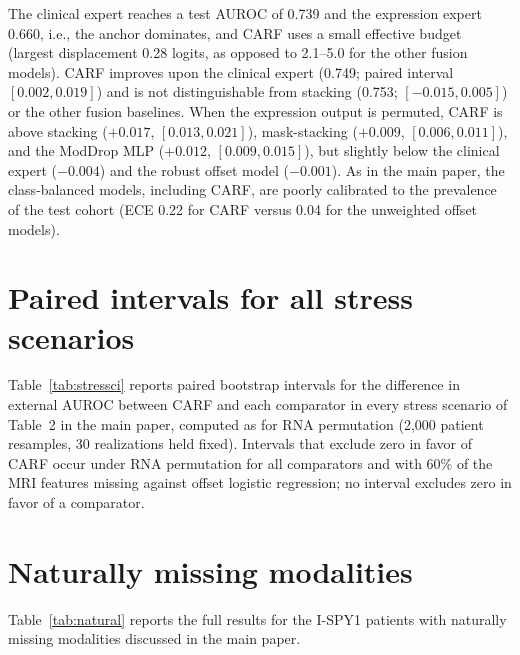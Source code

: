 \documentclass[runningheads]{llncs}
\begin{document}
The clinical expert reaches a test AUROC of 0.739 and the expression expert 0.660, i.e., the anchor dominates, and CARF uses a small effective budget (largest displacement 0.28 logits, as opposed to 2.1--5.0 for the other fusion models). CARF improves upon the clinical expert (0.749; paired interval $[0.002,0.019]$) and is not distinguishable from stacking (0.753; $[-0.015,0.005]$) or the other fusion baselines. When the expression output is permuted, CARF is above stacking ($+0.017$, $[0.013,0.021]$), mask-stacking ($+0.009$, $[0.006,0.011]$), and the ModDrop MLP ($+0.012$, $[0.009,0.015]$), but slightly below the clinical expert ($-0.004$) and the robust offset model ($-0.001$). As in the main paper, the class-balanced models, including CARF, are poorly calibrated to the prevalence of the test cohort (ECE 0.22 for CARF versus 0.04 for the unweighted offset models).

\section{Paired intervals for all stress scenarios}

Table~\ref{tab:stressci} reports paired bootstrap intervals for the difference in external AUROC between CARF and each comparator in every stress scenario of Table~2 in the main paper, computed as for RNA permutation (2{,}000 patient resamples, 30 realizations held fixed). Intervals that exclude zero in favor of CARF occur under RNA permutation for all comparators and with 60\% of the MRI features missing against offset logistic regression; no interval excludes zero in favor of a comparator.

\begin{table}[h]
\centering
\caption{CARF minus comparator external AUROC, median [2.5\%, 97.5\%] over 2{,}000 paired patient resamples, for all stress scenarios.}
\label{tab:stressci}
\end{table}

\section{Naturally missing modalities}

Table~\ref{tab:natural} reports the full results for the I-SPY1 patients with naturally missing modalities discussed in the main paper.

\begin{table}[h]
\centering
\caption{External AUROC and Brier score on I-SPY1 patients with naturally missing modalities. Models are frozen; absent modalities are passed as masks to CARF and mask-stacking, contribute zero in offset logistic regression with masks, are ignored by the mean of available experts, and are replaced by a probability of $0.5$ in stacking. \emph{All available} combines the complete cases with both partial subgroups; the 16 patients with clinical data only, for which CARF returns the clinical prediction exactly, are not included.}
\label{tab:natural}
\small
{}
\end{table}
\end{document}
